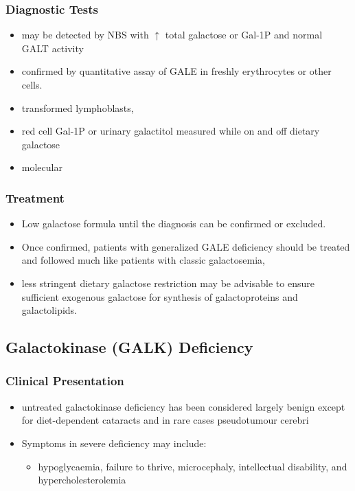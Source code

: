 \documentclass{scrartcl}
\begin{document}
\subsubsection{Diagnostic Tests}
\label{sec:orgc0bc899}
\begin{itemize}
\item may be detected by NBS with \(\uparrow\) total galactose or Gal-1P and normal GALT activity
\item confirmed by quantitative assay of GALE in freshly erythrocytes or other cells.
\item transformed lymphoblasts,
\item red cell Gal-1P or urinary galactitol measured while on and off dietary galactose
\item molecular
\end{itemize}

\subsubsection{Treatment}
\label{sec:org9fcc6c7}
\begin{itemize}
\item Low galactose formula until the diagnosis can be confirmed or excluded.
\item Once confirmed, patients with generalized GALE deficiency should be
treated and followed much like patients with classic galactosemia,
\item less stringent dietary galactose restriction may be advisable to
ensure sufficient exogenous galactose for synthesis of galactoproteins and galactolipids.
\end{itemize}
\subsection{Galactokinase (GALK) Deficiency}
\label{sec:org89585a9}
\subsubsection{Clinical Presentation}
\label{sec:org6eab6ce}
\begin{itemize}
\item untreated galactokinase deficiency has been considered largely
benign except for diet-dependent cataracts and in rare cases pseudotumour cerebri
\item Symptoms in severe deficiency may include:
\begin{itemize}
\item hypoglycaemia, failure to thrive, microcephaly, intellectual
disability, and hypercholesterolemia
\end{itemize}
\end{itemize}
\end{document}
